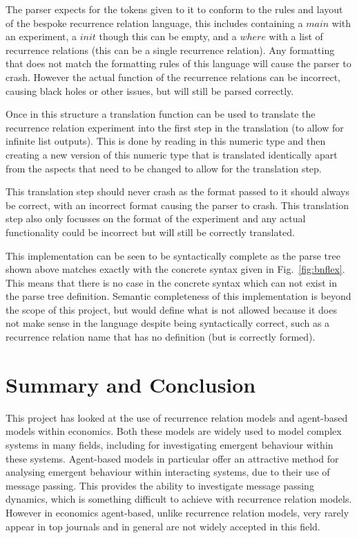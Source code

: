 \documentclass{article}
\begin{document}
The parser expects for the tokens given to it to conform to the rules and layout of the bespoke recurrence relation language, this includes containing a $main$ with an experiment, a $init$ though this can be empty, and a $where$ with a list of recurrence relations (this can be a single recurrence relation). Any formatting that does not match the formatting rules of this language will cause the parser to crash. However the actual function of the recurrence relations can be incorrect, causing black holes or other issues, but will still be parsed correctly.

Once in this structure a translation function can be used to translate the recurrence relation experiment into the first step in the translation (to allow for infinite list outputs). This is done by reading in this numeric type and then creating a new version of this numeric type that is translated identically apart from the aspects that need to be changed to allow for the translation step. 

This translation step should never crash as the format passed to it should always be correct, with an incorrect format causing the parser to crash. This translation step also only focusses on the format of the experiment and any actual functionality could be incorrect but will still be correctly translated. 

This implementation can be seen to be syntactically complete as the parse tree shown above matches exactly with the concrete syntax given in Fig.~\ref{fig:bnflex}. This means that there is no case in the concrete syntax which can not exist in the parse tree definition. Semantic completeness of this implementation is beyond the scope of this project, but would define what is not allowed because it does not make sense in the language despite being syntactically correct, such as a recurrence relation name that has no definition (but is correctly formed).


\newpage
\section{Summary and Conclusion }
This project has looked at the use of recurrence relation models and agent-based models within economics. Both these models are widely used to model complex systems in many fields, including for investigating emergent behaviour within these systems. Agent-based models in particular offer an attractive method for analysing emergent behaviour within interacting systems, due to their use of message passing. This provides the ability to investigate message passing dynamics, which is something difficult to achieve with recurrence relation models. However in economics agent-based, unlike recurrence relation models, very rarely appear in top journals and in general are not widely accepted in this field.     
\end{document}
